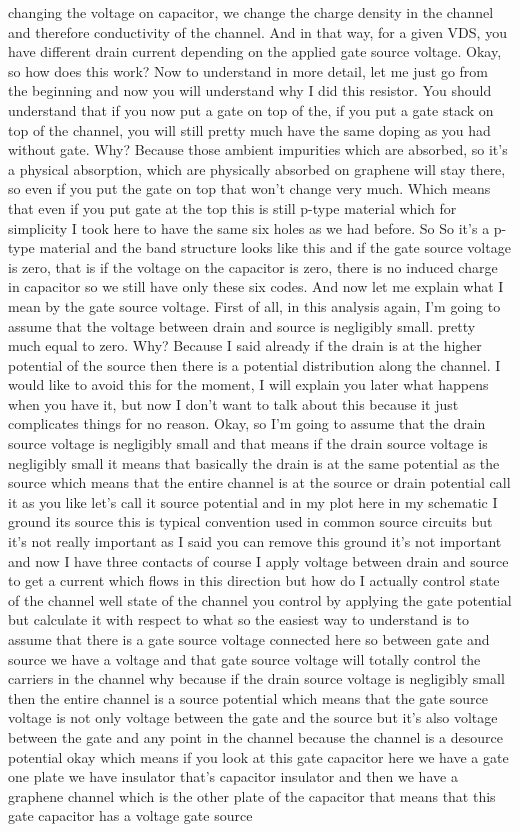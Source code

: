 changing the voltage on capacitor, we change the charge density in the channel and therefore conductivity of the channel. And in that way, for a given VDS, you have different drain current depending on the applied gate source voltage. Okay, so how does this work? Now to understand in more detail, let me just go from the beginning and now you will understand why I did this resistor. You should understand that if you now put a gate on top of the, if you put a gate stack on top of the channel, you will still pretty much have the same doping as you had without gate. Why? Because those ambient impurities which are absorbed, so it's a physical absorption, which are physically absorbed on graphene will stay there, so even if you put the gate on top that won't change very much. Which means that even if you put gate at the top this is still p-type material which for simplicity I took here to have the same six holes as we had before. So So it's a p-type material and the band structure looks like this and if the gate source voltage is zero, that is if the voltage on the capacitor is zero, there is no induced charge in capacitor so we still have only these six codes. And now let me explain what I mean by the gate source voltage. First of all, in this analysis again, I'm going to assume that the voltage between drain and source is negligibly small. pretty much equal to zero. Why? Because I said already if the drain is at the higher potential of the source then there is a potential distribution along the channel. I would like to avoid this for the moment, I will explain you later what happens when you have it, but now I don't want to talk about this because it just complicates things for no reason. Okay, so I'm going to assume that the drain source voltage is negligibly small and that means if the drain source voltage is negligibly small it means that basically the drain is at the same potential as the source which means that the entire channel is at the source or drain potential call it as you like let's call it source potential and in my plot here in my schematic I ground its source this is typical convention used in common source circuits but it's not really important as I said you can remove this ground it's not important and now I have three contacts of course I apply voltage between drain and source to get a current which flows in this direction but how do I actually control state of the channel well state of the channel you control by applying the gate potential but calculate it with respect to what so the easiest way to understand is to assume that there is a gate source voltage connected here so between gate and source we have a voltage and that gate source voltage will totally control the carriers in the channel why because if the drain source voltage is negligibly small then the entire channel is a source potential which means that the gate source voltage is not only voltage between the gate and the source but it's also voltage between the gate and any point in the channel because the channel is a desource potential okay which means if you look at this gate capacitor here we have a gate one plate we have insulator that's capacitor insulator and then we have a graphene channel which is the other plate of the capacitor that means that this gate capacitor has a voltage gate source 